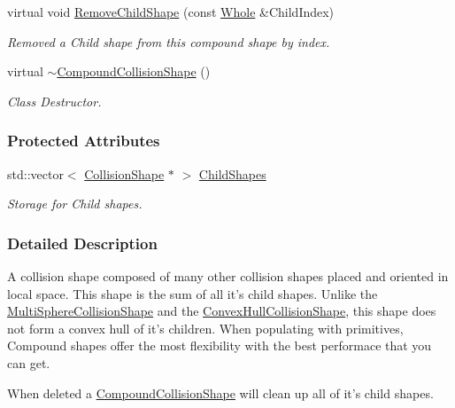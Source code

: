 \begin{DoxyCompactItemize}
virtual void \hyperlink{classMezzanine_1_1CompoundCollisionShape_a773f30f7d5046eb3d0ad051332a0b37e}{RemoveChildShape} (const \hyperlink{namespaceMezzanine_adcbb6ce6d1eb4379d109e51171e2e493}{Whole} \&ChildIndex)
\begin{DoxyCompactList}\small\item\em Removed a Child shape from this compound shape by index. \item\end{DoxyCompactList}\item 
\hypertarget{classMezzanine_1_1CompoundCollisionShape_a8dae4d989a8c3ffd4bb7f75fbaeb9c29}{
virtual \hyperlink{classMezzanine_1_1CompoundCollisionShape_a8dae4d989a8c3ffd4bb7f75fbaeb9c29}{$\sim$CompoundCollisionShape} ()}
\label{classMezzanine_1_1CompoundCollisionShape_a8dae4d989a8c3ffd4bb7f75fbaeb9c29}

\begin{DoxyCompactList}\small\item\em Class Destructor. \item\end{DoxyCompactList}\end{DoxyCompactItemize}
\subsubsection*{Protected Attributes}
\begin{DoxyCompactItemize}
\item 
\hypertarget{classMezzanine_1_1CompoundCollisionShape_a41503a9a43ed2b28720cc6ae63d42256}{
std::vector$<$ \hyperlink{classMezzanine_1_1CollisionShape}{CollisionShape} $\ast$ $>$ \hyperlink{classMezzanine_1_1CompoundCollisionShape_a41503a9a43ed2b28720cc6ae63d42256}{ChildShapes}}
\label{classMezzanine_1_1CompoundCollisionShape_a41503a9a43ed2b28720cc6ae63d42256}

\begin{DoxyCompactList}\small\item\em Storage for Child shapes. \item\end{DoxyCompactList}\end{DoxyCompactItemize}


\subsubsection{Detailed Description}
A collision shape composed of many other collision shapes placed and oriented in local space. This shape is the sum of all it's child shapes. Unlike the \hyperlink{classMezzanine_1_1MultiSphereCollisionShape}{MultiSphereCollisionShape} and the \hyperlink{classMezzanine_1_1ConvexHullCollisionShape}{ConvexHullCollisionShape}, this shape does not form a convex hull of it's children. When populating with primitives, Compound shapes offer the most flexibility with the best performace that you can get. \par
 \par
 When deleted a \hyperlink{classMezzanine_1_1CompoundCollisionShape}{CompoundCollisionShape} will clean up all of it's child shapes. 

